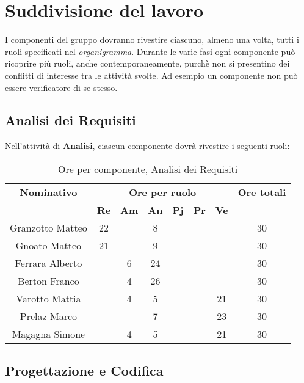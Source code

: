 \section{Suddivisione del lavoro}
I componenti del gruppo dovranno rivestire ciascuno, almeno una volta, tutti i ruoli specificati nel \textit{organigramma}.
Durante le varie fasi ogni componente può ricoprire più ruoli, anche contemporaneamente, purchè non si presentino dei conflitti di interesse tra le attività svolte. Ad esempio un componente non può essere verificatore di se stesso.
\subsection{Analisi dei Requisiti}
Nell'attività di \textbf{Analisi}, ciascun componente dovrà rivestire i seguenti ruoli:
\begin{table}[H]
	\begin{center}
		\begin{tabular}{|c|c|c|c|c|c|c|c|}
			\hline
			\textbf{Nominativo} & \multicolumn{6}{c|}{\textbf{Ore per ruolo}} & \textbf{Ore totali} \\
			& \textbf{Re} & \textbf{Am} & \textbf{An} & \textbf{Pj} & \textbf{Pr} & \textbf{Ve} & \\
			\hline
			Granzotto Matteo	&	22	&	 	&	8 	&		&	 	& 		&	30	\\
			\hline
			Gnoato Matteo		&	21	&		&	9	&		&		&		&	30	\\
			\hline
			Ferrara Alberto		&		&	6	&	24	&	 	&		&		& 	30	\\
			\hline
			Berton Franco		&		&	4	&	26	&		&		&		&	30	\\
			\hline
			Varotto Mattia 		&		&	4	&	5	&		&		&	21	& 	30	\\
			\hline
			Prelaz Marco 		& 		&		&	7	&		&		&	23	&	30	\\
			\hline
			Magagna Simone 		&		&	4	&	5	&		&		& 	21	&	30	\\
			\hline
		\end{tabular}
	\end{center}
	\caption{Ore per componente, Analisi dei Requisiti}
\end{table}


\subsection{Progettazione e Codifica}
